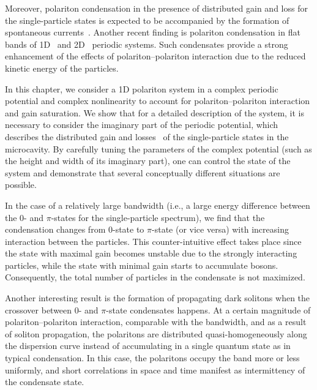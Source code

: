 Moreover, polariton condensation in the presence of distributed gain and loss for the single-particle states is expected to be accompanied by the formation of spontaneous currents~\cite{Nalitov:2017aa}.
Another recent finding is polariton condensation in flat bands of 1D~\cite{Baboux:2016aa} and 2D~\cite{Klembt:2017aa,Whittaker:2018ab,Sun:2018aa} periodic systems.
Such condensates provide a strong enhancement of the effects of polariton--polariton interaction due to the reduced kinetic energy of the particles.

In this chapter, we consider a 1D polariton system in a complex periodic potential and complex nonlinearity to account for polariton--polariton interaction and gain saturation.
We show that for a detailed description of the system, it is necessary to consider the imaginary part of the periodic potential, which describes the distributed gain and losses~\cite{Winkler:2016aa} of the single-particle states in the microcavity.
By carefully tuning the parameters of the complex potential (such as the height and width of its imaginary part), one can control the state of the system and demonstrate that several conceptually different situations are possible.

In the case of a relatively large bandwidth (i.e., a large energy difference between the $0$- and $\pi$-states for the single-particle spectrum), we find that the condensation changes from $0$-state to $\pi$-state (or vice versa) with increasing interaction between the particles.
This counter-intuitive effect takes place since the state with maximal gain becomes unstable due to the strongly interacting particles, while the state with minimal gain starts to accumulate bosons.
Consequently, the total number of particles in the condensate is not maximized.

Another interesting result is the formation of propagating dark solitons when the crossover between $0$- and $\pi$-state condensates happens.
At a certain magnitude of polariton--polariton interaction, comparable with the bandwidth, and as a result of soliton propagation, the polaritons are distributed quasi-homogeneously along the dispersion curve instead of accumulating in a single quantum state as in typical condensation.
In this case, the polaritons occupy the band more or less uniformly, and short correlations in space and time manifest as intermittency of the condensate state.

